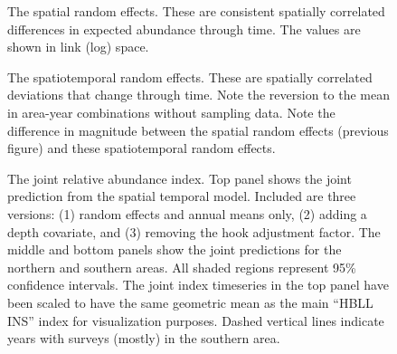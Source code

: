 \documentclass[11pt]{book}
\begin{document}
\begin{figure}[htb]

{\centering {} 

}

\caption{The spatial random effects. These are consistent spatially correlated differences in expected abundance through time. The values are shown in link (log) space.}\label{fig:hbll-spatial-re}
\end{figure}
\begin{figure}[htb]

{\centering {} 

}

\caption{The spatiotemporal random effects. These are spatially correlated deviations that change through time. Note the reversion to the mean in area-year combinations without sampling data. Note the difference in magnitude between the spatial random effects (previous figure) and these spatiotemporal random effects.}\label{fig:hbll-spatiotemporal-re}
\end{figure}
\begin{figure}[htb]

{\centering {} 

}

\caption{The joint relative abundance index. Top panel shows the joint prediction from the spatial temporal model. Included are three versions: (1) random effects and annual means only, (2) adding a depth covariate, and (3) removing the hook adjustment factor. The middle and bottom panels show the joint predictions for the northern and southern areas. All shaded regions represent 95\% confidence intervals. The joint index timeseries in the top panel have been scaled to have the same geometric mean as the main ``HBLL INS'' index for visualization purposes. Dashed vertical lines indicate years with surveys (mostly) in the southern area.}\label{fig:hbll-index}
\end{figure}
\clearpage
\end{document}
